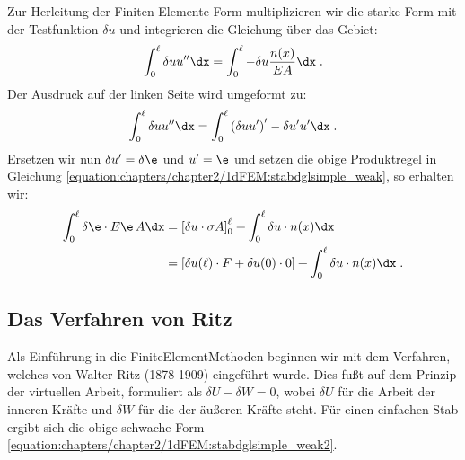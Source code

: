 \documentclass[letterpaper,10pt,german]{jupyterBook}
\begin{document}
\sphinxAtStartPar
Zur Herleitung der Finiten Elemente Form multiplizieren  wir die starke Form mit der Testfunktion \(\delta u\) und integrieren die Gleichung über das Gebiet:
\begin{equation}\label{equation:chapters/chapter2/1dFEM:stabdglsimple_weak}
\begin{split} \int_{0}^{\ell} \delta u u^{\prime \prime} \dx = \int_{0}^{\ell} - \delta u \frac{n(x)}{EA} \dx\; .\end{split}
\end{equation}
\sphinxAtStartPar
Der Ausdruck auf der linken Seite wird umgeformt zu:
\begin{equation}\label{equation:chapters/chapter2/1dFEM:stabdglsimple_product}
\begin{split} \int_{0}^{\ell} \delta u u^{\prime \prime} \dx = \int_{0}^{\ell} \left(\delta u u^{\prime}\right)^{\prime} - \delta u^{\prime}  u^{\prime}  \dx\; .\end{split}
\end{equation}
\sphinxAtStartPar
Ersetzen wir nun \(\delta u^{\prime}=\delta \e\) und \(u^{\prime}=\e\) und setzen die obige Produktregel in Gleichung \eqref{equation:chapters/chapter2/1dFEM:stabdglsimple_weak}, so erhalten wir:
\begin{equation}\label{equation:chapters/chapter2/1dFEM:stabdglsimple_weak2}
\begin{split}\begin{align}
 \int_{0}^{\ell} \delta \e \cdot E\e \, A \dx & = \left[\delta u \cdot \sigma A \right]_0^{\ell} + \int_0^{\ell} \delta u \cdot n(x) \dx\;  \\
 & = \left[ \delta u(\ell) \cdot F + \delta u(0) \cdot 0\right]+ \int_0^{\ell} \delta u \cdot n(x) \dx\; .
 \end{align}\end{split}
\end{equation}

\subsection{Das Verfahren von Ritz}
\label{\detokenize{chapters/chapter2/1dFEM:das-verfahren-von-ritz}}
\sphinxAtStartPar
Als Einführung in die Finite\sphinxhyphen{}Element\sphinxhyphen{}Methoden beginnen wir mit dem Verfahren, welches von Walter Ritz (1878 \sphinxhyphen{} 1909) eingeführt wurde. Dies fußt auf dem Prinzip der virtuellen Arbeit, formuliert als \(\delta U − \delta W = 0\), wobei \(\delta U\) für die Arbeit der inneren Kräfte und \(\delta W\) für die der äußeren Kräfte steht. Für einen einfachen Stab ergibt sich die obige schwache Form \eqref{equation:chapters/chapter2/1dFEM:stabdglsimple_weak2}.
\end{document}
